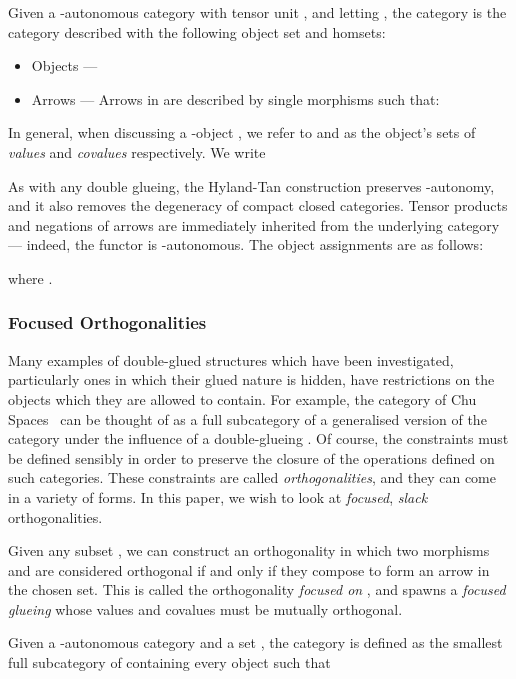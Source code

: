\documentclass{LMCS}
\theoremstyle{plain}\newtheorem*{cLm}{Claim}
\newcommand{\p}{} \newcommand{\N}{\mathbb{N}}
\newcommand{\hugh}[1]{#1}
\begin{document}
\begin{defi} \label{GCDefn}
Given a -autonomous category  \hugh{with tensor unit , and letting }, the category  is the category described with the following object set and homsets:
\begin{itemize}
\item Objects --- 
\item Arrows --- Arrows in  are described by single morphisms  such that:
	
\end{itemize}
\end{defi}

In general, when discussing a -object , we refer to  and  as the object's sets of \emph{values} and \emph{covalues} respectively. We write


As with any double glueing, the Hyland-Tan construction preserves -autonomy, and it also removes the degeneracy of compact closed categories. Tensor products and negations of arrows are immediately inherited from the underlying category --- indeed, the functor  is -autonomous. The object assignments are as follows:

where .

\subsubsection{Focused Orthogonalities} \label{SectionFocusedOrth}

Many examples of double-glued structures which have been investigated, particularly ones in which their glued nature is hidden, have restrictions on the objects which they are allowed to contain. For example, the category of Chu Spaces~\cite{Chu79} can be thought of as a full subcategory of a generalised version of the category  under the influence of a double-glueing \cite{Hug04}. Of course, the constraints must be defined sensibly in order to preserve the closure of the operations defined on such categories. These constraints are called \emph{orthogonalities}, and they can come in a variety of forms. In this paper, we wish to look at \emph{focused}, \emph{slack} orthogonalities.

\p Given any subset , we can construct an orthogonality in which two morphisms  and  are considered orthogonal if and only if they compose to form an arrow in the chosen set. This is called the orthogonality \emph{focused on} , and spawns a \emph{focused glueing}  whose values and covalues must be mutually orthogonal.

\begin{defi}
Given a -autonomous category  and a set , the category  is defined as the smallest full subcategory of  containing every object  such that

\end{defi}
\end{document}
